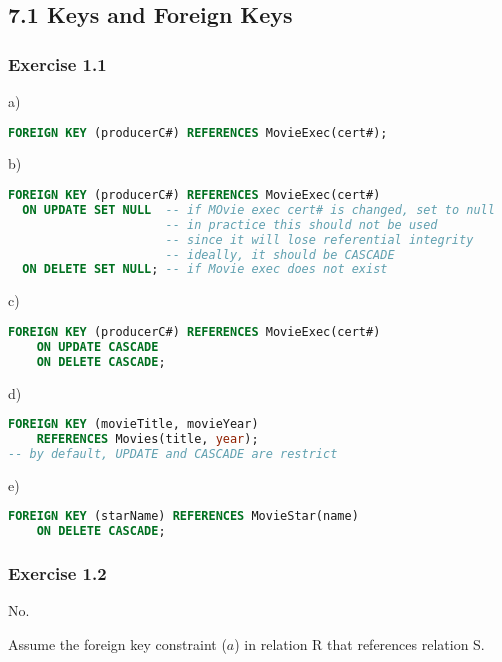 \documentclass[../../main.tex]{subfiles}
\begin{document}
\subsection{7.1 Keys and Foreign Keys}

\subsubsection*{Exercise 1.1}

a)

\begin{lstlisting}[language=sql]
  FOREIGN KEY (producerC#) REFERENCES MovieExec(cert#);
\end{lstlisting}

b)

\begin{lstlisting}[language=sql]
  FOREIGN KEY (producerC#) REFERENCES MovieExec(cert#)
  ON UPDATE SET NULL  -- if MOvie exec cert# is changed, set to null
                      -- in practice this should not be used
                      -- since it will lose referential integrity
                      -- ideally, it should be CASCADE
  ON DELETE SET NULL; -- if Movie exec does not exist
\end{lstlisting}

c)

\begin{lstlisting}[language=sql]
  FOREIGN KEY (producerC#) REFERENCES MovieExec(cert#)
    ON UPDATE CASCADE
    ON DELETE CASCADE;
\end{lstlisting}

d)

\begin{lstlisting}[language=sql]
  FOREIGN KEY (movieTitle, movieYear)
    REFERENCES Movies(title, year);
-- by default, UPDATE and CASCADE are restrict
\end{lstlisting}

e)

\begin{lstlisting}[language=sql]
  FOREIGN KEY (starName) REFERENCES MovieStar(name)
    ON DELETE CASCADE;
\end{lstlisting}

\subsubsection*{Exercise 1.2}

No.

Assume the foreign key constraint ($a$) in relation R that references relation S.
\end{document}
